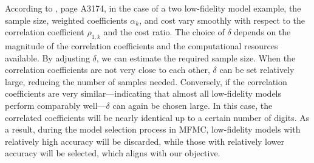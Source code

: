 \documentclass[final,3p,times,11pt]{elsarticle}
\begin{document}
According to \cite{PeWiGu:2016}, page A3174, in the case of a two low-fidelity model example, the sample size, weighted coefficients $\alpha_k$, and cost vary smoothly with respect to the correlation coefficient $\rho_{1,k}$ and the cost ratio. The choice of $\delta$ depends on the magnitude of the correlation coefficients and the computational resources available. By adjusting $\delta$, we can estimate the required sample size.  When the correlation coefficients are not very close to each other, $\delta$ can be set relatively large, reducing the number of samples needed. Conversely, if the correlation coefficients are very similar—indicating that almost all low-fidelity models perform comparably well—$\delta$ can again be chosen large. In this case, the correlated coefficients will be nearly identical up to a certain number of digits. As a result, during the model selection process in MFMC, low-fidelity models with relatively high accuracy will be discarded, while those with relatively lower accuracy will be selected, which aligns with our objective. 





% 

\end{document}
